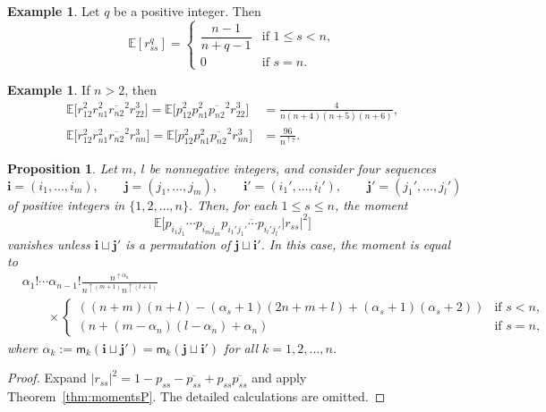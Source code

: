 \documentclass[pdftex]{sigma}
\numberwithin{equation}{section}
\newtheorem{Proposition}[Theorem]{Proposition}
\theoremstyle{definition}
\newtheorem{Example}[Theorem]{Example}
\newcommand{\mult}{\mathsf{m}}
\begin{document}
\begin{Example}\label{ex:rss_q}
Let $q$ be a positive integer. Then
\[
\mathbb{E} [ r_{ss}^q ]= \begin{cases}
\dfrac{n-1}{n+q-1} & \text{if $1 \le s<n$}, \\
0 & \text{if $s=n$}.
\end{cases}
\]
\end{Example}


\begin{Example}\label{ex:mixed_r}
If $n > 2$, then
\begin{align*}
\mathbb{E} \bigl[r_{12}^2 r_{n1}^2 \overline{r_{n2}}^2 r_{22}^3\bigr]
= \mathbb{E} \bigl[p_{12}^2 p_{n1}^2 \overline{p_{n2}}^2 r_{22}^3\bigr]
&=\frac{4}{n(n+4)(n+5)(n+6)}, \\
\mathbb{E} \bigl[r_{12}^2 r_{n1}^2 \overline{r_{n2}}^2 r_{nn}^3\bigr]
=\mathbb{E} \bigl[p_{12}^2 p_{n1}^2 \overline{p_{n2}}^2 r_{nn}^3\bigr]
&= \frac{96}{n^{\uparrow 7}}.
\end{align*}
\end{Example}

\begin{Proposition} \label{prop:two_r}
Let $m$, $l$ be nonnegative integers, and consider four sequences
\[
\bm{i}=(i_1,\dots, i_m), \qquad \bm{j} =(j_1,\dots, j_m), \qquad
\bm{i}'=(i_1',\dots, i_l'), \qquad \bm{j}' =(j_1',\dots, j_l')
\]
 of positive integers in $\{1,2,\dots,n\}.$
Then, for each $1 \le s \le n$, the moment
\[
\mathbb{E} \bigl[p_{i_1 j_1} \cdots p_{i_m j_m} \overline{p_{i_1' j_1'} \cdots p_{i_l' j_l'}} |r_{ss}|^2 \bigr]
\]
 vanishes unless $\bm{i} \sqcup \bm{j}'$ is a permutation of $\bm{j} \sqcup \bm{i}'$.
In this case, the moment is equal to
\begin{align*}
&\alpha_1 ! \cdots \alpha_{n-1}! \frac{n^{\uparrow \alpha_n}}{n^{\uparrow (m+1)} n^{\uparrow (l+1)}} \\
& \qquad \times
\begin{cases}
 ( (n+m)(n+l) -(\alpha_s+1)(2n+m+l) +(\alpha_s+1)(\alpha_s+2) ) & \text{if $s<n$},
\\
 ( n +(m-\alpha_n)(l-\alpha_n) + \alpha_n ) & \text{if $s=n$},
\end{cases}
\end{align*}
where $\alpha_k:=\mult_{k}(\bm{i}\sqcup \bm{j}') = \mult_{k}(\bm{j}\sqcup\bm{i}')$
for all $k=1,2,\dots, n$.
\end{Proposition}

\begin{proof}
Expand $|r_{ss}|^2 = 1- p_{ss} -\overline{p_{ss}} +p_{ss}\overline{p_{ss}}$ and apply Theorem~\ref{thm:momentsP}.
The detailed calculations are omitted.
\end{proof}
\end{document}
